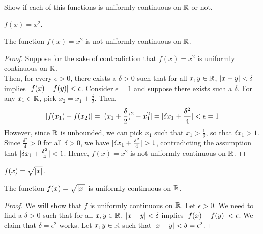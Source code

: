 \begin{problem}
  Show if each of this functions is uniformly continuous on $\mathbb{R}$ or not.
  \begin{enumroman}
    \item $f(x) = x^2$.
      \begin{answer}
        \begin{claim}
          The function $f(x) = x^2$ is not uniformly continuous on $\mathbb{R}$.
          \begin{proof}
            Suppose for the sake of contradiction that $f(x) = x^2$
            is uniformly continuous on $\mathbb{R}$. \\
            Then, for every $\epsilon > 0$, there exists a $\delta > 0$
            such that for all $x, y \in \mathbb{R}$, $\lvert x - y\rvert < \delta$ implies
            $\lvert f(x) - f(y)\rvert < \epsilon$.
            Consider $\epsilon = 1$ and suppose there exists such a $\delta$.
            For any $x_1 \in \mathbb{R}$, pick $x_2 = x_1 + \frac{\delta}{2}$.
            Then,
            \begin{align*}
              \lvert f(x_1) - f(x_2)\rvert
                = \lvert(x_1 + \frac{\delta}{2})^2 - x_1^2\rvert
                = \lvert\delta x_1 + \frac{\delta^2}{4}\rvert < \epsilon = 1
            \end{align*}
            However, since $\mathbb{R}$ is unbounded, we can pick $x_1$ such that
            $x_1 > \frac{1}{\delta}$, so that $\delta x_1 > 1$.
            Since $\frac{\delta^2}{4} > 0$ for all $\delta > 0$,
            we have $\lvert\delta x_1 + \frac{\delta^2}{4}\rvert > 1$,
            contradicting the assumption that $\lvert\delta x_1 + \frac{\delta^2}{4}\rvert < 1$.
            Hence, $f(x) = x^2$ is not uniformly continuous on $\mathbb{R}$.
          \end{proof}
        \end{claim}
      \end{answer}
    \item $f(x) = \sqrt{\lvert x\rvert}$.
      \begin{answer}
        \begin{claim}
          The function $f(x) = \sqrt{\lvert x\rvert}$ is uniformly continuous on $\mathbb{R}$.
          \begin{proof}
            We will show that $f$ is uniformly continuous on $\mathbb{R}$.
            Let $\epsilon > 0$.
            We need to find a $\delta > 0$ such that for all $x, y \in \mathbb{R}$,
            $\lvert x - y\rvert < \delta$ implies $\lvert f(x) - f(y)\rvert < \epsilon$.
            We claim that $\delta = \epsilon^2$ works.
            Let $x, y \in \mathbb{R}$ such that $\lvert x - y\rvert < \delta = \epsilon^2$.

\end{proof}
\end{claim}
\end{answer}
\end{enumroman}
\end{problem}
